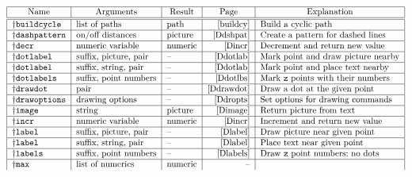 \begin{table}[htp]
\caption{Function-Like Macros}
$$\begin{tabular}{|l|l|l|r|l|}
\hline
\multicolumn1{|c}{Name}&  \multicolumn1{|c}{Arguments}&
        \multicolumn1{|c}{Result}&  \multicolumn1{|c}{Page}&
        \multicolumn1{|c|}{Explanation}\\
\hline
\hline
\pl\tt \verb|buildcycle|&       list of paths&  path&   \pageref{buildcy}&
        Build a cyclic path\\\hline
\pl\tt \verb|dashpattern|&      on/off distances&       picture&        \pageref{Ddshpat}&
        Create a pattern for dashed lines\\\hline
\pl\tt \verb|decr|&     numeric variable&       numeric&        \pageref{Dincr}&
        Decrement and return new value\\\hline
\pl\tt \verb|dotlabel|& suffix, picture, pair&  --&     \pageref{Ddotlab}&
        Mark point and draw picture nearby\\\hline
\pl\tt \verb|dotlabel|& suffix, string, pair&   --&     \pageref{Ddotlab}&
        Mark point and place text nearby\\\hline
\pl\tt \verb|dotlabels|&        suffix, point numbers&  --&     \pageref{Ddotlbs}&
        Mark {\tt z} points with their numbers\\\hline
\pl\tt \verb|drawdot|&          pair&       --&     \pageref{Ddrawdot}&
        Draw a dot at the given point\\\hline
\pl\tt \verb|drawoptions|&      drawing options&        --&     \pageref{Ddropts}&
        Set options for drawing commands\\\hline
\pl\tt \verb|image|&              string&       picture&      \pageref{Dimage}&
        Return picture from text\\\hline
\pl\tt \verb|incr|&     numeric variable&       numeric&       \pageref{Dincr}&
        Increment and return new value\\\hline
\pl\tt \verb|label|&    suffix, picture, pair&  --&     \pageref{Dlabel}&
        Draw picture near given point\\\hline
\pl\tt \verb|label|&    suffix, string, pair&   --&     \pageref{Dlabel}&
        Place text near given point\\\hline
\pl\tt \verb|labels|&   suffix, point numbers&  --&     \pageref{Dlabels}&
        Draw {\tt z} point numbers; no dots\\\hline
\pl\tt \verb|max|&      list of numerics&       numeric&        --&

\end{tabular}$$
\end{table}
